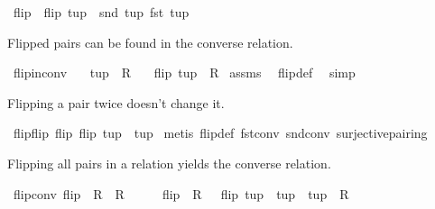 \begin{isabellebody}
\begin{isamarkuptext}
\end{isamarkuptext}%
\isamarkuptrue%
\isamarkupfalse%
\ flip\ \ {\isachardoublequoteopen}flip\ tup\ {\isacharequal}\ {\isacharparenleft}snd\ tup{\isacharcomma}\ fst\ tup{\isacharparenright}{\isachardoublequoteclose}%
\begin{isamarkuptext}%
Flipped pairs can be found in the converse relation.%
\end{isamarkuptext}%
\isamarkuptrue%
\isamarkupfalse%
\ flip{\isacharunderscore}in{\isacharunderscore}conv{\isacharcolon}\isanewline
\ \ \ {\isachardoublequoteopen}tup\ {\isasymin}\ R{\isachardoublequoteclose}\isanewline
\ \ \ {\isachardoublequoteopen}flip\ tup\ {\isasymin}\ R{\isasyminverse}{\isachardoublequoteclose}\isanewline
%
\isadelimproof
%
\endisadelimproof
%
\isatagproof
{}\isamarkupfalse%
\ assms\ \isamarkupfalse%
\ flip{\isacharunderscore}def\ \isamarkupfalse%
\ simp%
\endisatagproof
{\isafoldproof}%
%
\isadelimproof
%
\endisadelimproof
%
\begin{isamarkuptext}%
Flipping a pair twice doesn't change it.%
\end{isamarkuptext}%
\isamarkuptrue%
\isamarkupfalse%
\ flip{\isacharunderscore}flip{\isacharcolon}\ {\isachardoublequoteopen}flip\ {\isacharparenleft}flip\ tup{\isacharparenright}\ {\isacharequal}\ tup{\isachardoublequoteclose}\isanewline
%
\isadelimproof
%
\endisadelimproof
%
\isatagproof
{}\isamarkupfalse%
\ {\isacharparenleft}metis\ flip{\isacharunderscore}def\ fst{\isacharunderscore}conv\ snd{\isacharunderscore}conv\ surjective{\isacharunderscore}pairing{\isacharparenright}%
\endisatagproof
{\isafoldproof}%
%
\isadelimproof
%
\endisadelimproof
%
\begin{isamarkuptext}%
Flipping all pairs in a relation yields the converse relation.%
\end{isamarkuptext}%
\isamarkuptrue%
\isamarkupfalse%
\ flip{\isacharunderscore}conv{\isacharcolon}\ {\isachardoublequoteopen}flip\ {\isacharbackquote}\ R\ {\isacharequal}\ R{\isasyminverse}{\isachardoublequoteclose}\isanewline
%
\isadelimproof
%
\endisadelimproof
%
\isatagproof
{}\isamarkupfalse%
\ {\isacharminus}\isanewline
\ \ \isamarkupfalse%
\ {\isachardoublequoteopen}flip\ {\isacharbackquote}\ R\ {\isacharequal}\ {\isacharbraceleft}\ flip\ tup\ {\isacharbar}\ tup\ {\isachardot}\ tup\ {\isasymin}\ R\ {\isacharbraceright}{\isachardoublequoteclose}\ \isamarkupfalse%

\end{isabellebody}
